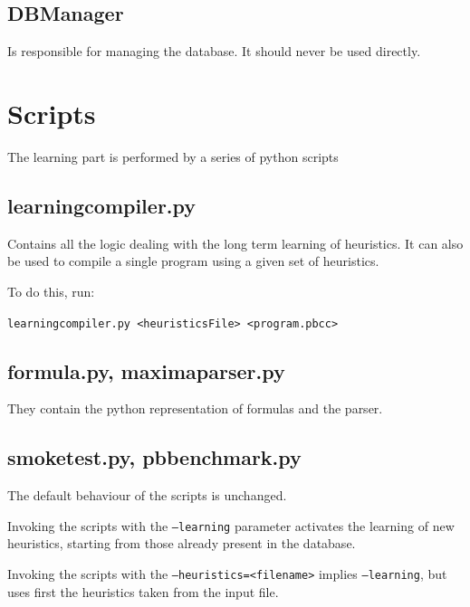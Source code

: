 \documentclass{article}
\begin{document}
\subsection{DBManager}
Is responsible for managing the database. It should never be used directly.

\section{Scripts}
The learning part is performed by a series of python scripts

\subsection{learningcompiler.py}
Contains all the logic dealing with the long term learning of heuristics.
It can also be used to compile a single program using a given set of heuristics.

To do this, run:

\texttt{learningcompiler.py <heuristicsFile> <program.pbcc>}

\subsection{formula.py, maximaparser.py}
They contain the python representation of formulas and the parser.

\subsection{smoketest.py, pbbenchmark.py}
The default behaviour of the scripts is unchanged.

Invoking the scripts with the \texttt{--learning} parameter activates the learning of new heuristics, starting from those already present in the database.

Invoking the scripts with the \texttt{--heuristics=<filename>} implies \texttt{--learning}, but uses first the heuristics taken from the input file.
\end{document}
